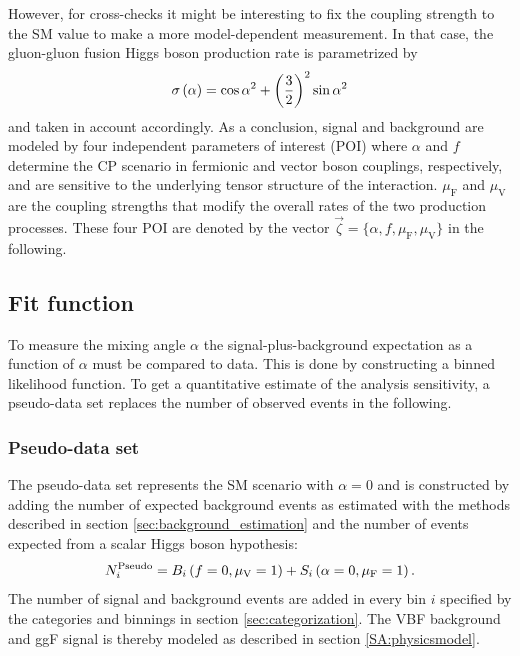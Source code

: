 However, for cross-checks it might be interesting to fix the coupling strength to the SM value to make a more model-dependent measurement.
In that case, the gluon-gluon fusion Higgs boson production rate is parametrized by
\begin{equation}\label{SA:rate_constraint}
    \sigma \left( \alpha \right) = \cos{\alpha}^2 +\left( \frac{3}{2} \right)^2 \sin{\alpha}^2
\end{equation} 
and taken in account accordingly.\newline{}
As a conclusion, signal and background are modeled by four independent parameters of interest (POI) where $\alpha$ and $f$ determine the CP scenario in fermionic and vector boson couplings, respectively, and are sensitive to the underlying tensor structure of the interaction. $\mu_\text{F}$ and $\mu_\text{V}$ are the coupling strengths
that modify the overall rates of the two production processes. These four POI are denoted by the vector $\vec{\zeta}=\{\alpha, f, \mu_\text{F}, \mu_\text{V} \}$ in the following.

\subsection{Fit function}
To measure the mixing angle $\alpha$ the signal-plus-background expectation as a function of $\alpha$ must be compared to data. This is done by constructing a binned likelihood function.
To get a quantitative estimate of the analysis sensitivity, a pseudo-data set replaces the number of observed events in the following.

\subsubsection{Pseudo-data set}
The pseudo-data set represents the SM scenario with $\alpha=0$  and is constructed by adding the number of expected background events as estimated with the methods described in section \ref{sec:background_estimation} and the number of events expected from a scalar Higgs boson hypothesis: 
\begin{equation}
    N_i^{\text{Pseudo}} = B_i \left( f=0,\mu_\text{V}=1 \right) +  S_i \left( \alpha=0, \mu_\text{F}=1 \right).
\end{equation}
The number of signal and background events are added in every bin $i$ specified by the categories and binnings in section \ref{sec:categorization}. The VBF background and ggF signal is thereby modeled as described in section \ref{SA:physicsmodel}. 

